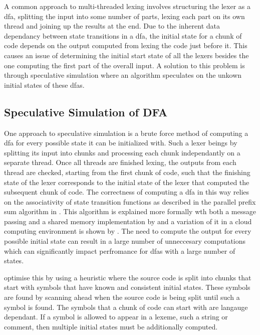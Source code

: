 A common approach to multi-threaded lexing involves structuring the lexer as a
\gls{dfa}, splitting the input into some number of parts, lexing each part on
its own thread and joining up the results at the end. Due to the inherent data
dependancy between state transitions in a \gls{dfa}, the initial state for a
chunk of code depends on the output computed from lexing the code just before
it. This causes an issue of determining the initial start state of all the
lexers besides the one computing the first part of the overall input. A solution
to this problem is through speculative simulation where an algorithm speculates
on the unkown initial states of these \gls{dfa}s.

\subsection{Speculative Simulation of DFA}

One approach to speculative simulation is a brute force method of computing
a \gls{dfa} for every possible state it can be initialized with. Such a
lexer beings by splitting its input into chunks and processing each chunk
independantly on a separate thread. Once all threads are finished lexing,
the outputs from each thread are checked, starting from the first chunk of
code, such that the finishing state of the lexer corresponds to the initial
state of the lexer that computed the subsequent chunk of code. The correctness
of computing a \gls{dfa} in this way relies on the  associativity of state
transition functions as described in the parallel prefix sum algorithm in
\cite{hillis_data_1986}. This algorithm is explained more formally wth both a
message passing and a shared memory implementation by \cite{holub_parallel_2009}
and a variation of it in a cloud computing environment is shown by
\cite{ko_speculative_2012}. The need to compute the output for every possible
initial state can result in a large number of unneccesary computations which can
significantly impact perfromance for \glspl{dfa} with a large number of states.

\cite{barenghi_parallel_2015} optimise this by using a heuristic where the
source code is split into chunks that start with symbols that have known and
consistent initial states. These symbols are found by scanning ahead when the
source code is being split until such a symbol is found. The symbols that a
chunk of code can start with are langauge dependant. If a symbol is allowed to
appear in a lexeme, such a string or comment, then multiple initial states must
be additionally computed.

